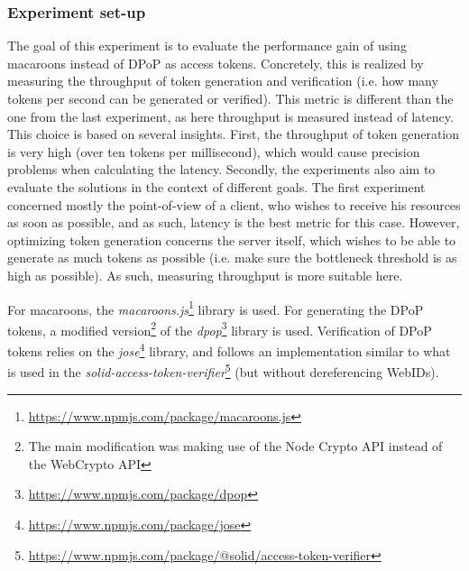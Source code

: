 \subsubsection{Experiment set-up}
The goal of this experiment is to evaluate the performance gain of using macaroons instead of \gls{DPoP} as access tokens. Concretely, this is realized by measuring the throughput of token generation and verification (i.e. how many tokens per second can be generated or verified). This metric is different than the one from the last experiment, as here throughput is measured instead of latency. This choice is based on several insights. First, the throughput of token generation is very high (over ten tokens per millisecond), which would cause precision problems when calculating the latency. Secondly, the experiments also aim to evaluate the solutions in the context of different goals. The first experiment concerned mostly the point-of-view of a client, who wishes to receive his resources as soon as possible, and as such, latency is the best metric for this case. However, optimizing token generation concerns the server itself, which wishes to be able to generate as much tokens as possible (i.e. make sure the bottleneck threshold is as high as possible). As such, measuring throughput is more suitable here.

For macaroons, the \textit{macaroons.js}\footnote{\url{https://www.npmjs.com/package/macaroons.js}} library is used. For generating the \gls{DPoP} tokens, a modified version\footnote{The main modification was making use of the Node Crypto API instead of the WebCrypto API} of the \textit{dpop}\footnote{\url{https://www.npmjs.com/package/dpop}} library is used. Verification of \gls{DPoP} tokens relies on the \textit{jose}\footnote{\url{https://www.npmjs.com/package/jose}} library, and follows an implementation similar to what is used in the \textit{solid-access-token-verifier}\footnote{\url{https://www.npmjs.com/package/@solid/access-token-verifier}} (but without dereferencing WebIDs).

